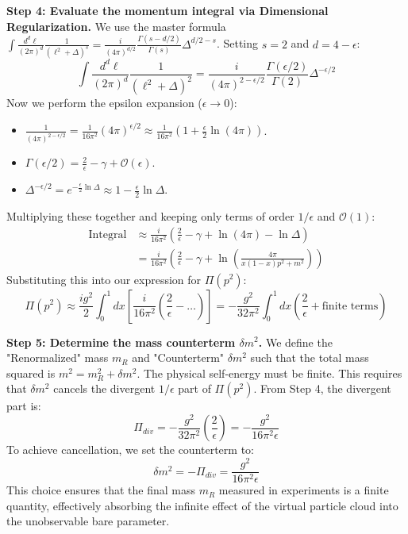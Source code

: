 \begin{solution}
\textbf{Step 4: Evaluate the momentum integral via Dimensional Regularization.}
We use the master formula $\int \frac{d^d \ell}{(2\pi)^d} \frac{1}{(\ell^2 + \Delta)^s} = \frac{i}{(4\pi)^{d/2}} \frac{\Gamma(s-d/2)}{\Gamma(s)} \Delta^{d/2-s}$.
Setting $s=2$ and $d=4-\epsilon$:
\begin{equation*}
    \int \frac{d^d \ell}{(2\pi)^d} \frac{1}{(\ell^2 + \Delta)^2} = \frac{i}{(4\pi)^{2-\epsilon/2}} \frac{\Gamma(\epsilon/2)}{\Gamma(2)} \Delta^{-\epsilon/2}
\end{equation*}
Now we perform the epsilon expansion ($\epsilon \to 0$):
\begin{itemize}
    \item $\frac{1}{(4\pi)^{2-\epsilon/2}} = \frac{1}{16\pi^2} (4\pi)^{\epsilon/2} \approx \frac{1}{16\pi^2} (1 + \frac{\epsilon}{2} \ln(4\pi))$.
    \item $\Gamma(\epsilon/2) = \frac{2}{\epsilon} - \gamma + \mathcal{O}(\epsilon)$.
    \item $\Delta^{-\epsilon/2} = e^{-\frac{\epsilon}{2}\ln\Delta} \approx 1 - \frac{\epsilon}{2}\ln\Delta$.
\end{itemize}
Multiplying these together and keeping only terms of order $1/\epsilon$ and $\mathcal{O}(1)$:
\begin{align*}
    \text{Integral} &\approx \frac{i}{16\pi^2} \left( \frac{2}{\epsilon} - \gamma + \ln(4\pi) - \ln\Delta \right) \\
    &= \frac{i}{16\pi^2} \left( \frac{2}{\epsilon} - \gamma + \ln \left( \frac{4\pi}{x(1-x)p^2 + m^2} \right) \right)
\end{align*}
Substituting this into our expression for $\Pi(p^2)$:
\begin{equation*}
    \Pi(p^2) \approx \frac{i g^2}{2} \int_0^1 dx \left[ \frac{i}{16\pi^2} \left( \frac{2}{\epsilon} - \dots \right) \right] = -\frac{g^2}{32\pi^2} \int_0^1 dx \left( \frac{2}{\epsilon} + \text{finite terms} \right)
\end{equation*}

\textbf{Step 5: Determine the mass counterterm $\delta m^2$.}
We define the "Renormalized" mass $m_R$ and "Counterterm" $\delta m^2$ such that the total mass squared is $m^2 = m_R^2 + \delta m^2$.
The physical self-energy must be finite. This requires that $\delta m^2$ cancels the divergent $1/\epsilon$ part of $\Pi(p^2)$.
From Step 4, the divergent part is:
\begin{equation*}
    \Pi_{div} = -\frac{g^2}{32\pi^2} \left( \frac{2}{\epsilon} \right) = -\frac{g^2}{16\pi^2 \epsilon}
\end{equation*}
To achieve cancellation, we set the counterterm to:
\begin{equation*}
    \delta m^2 = - \Pi_{div} = \frac{g^2}{16\pi^2 \epsilon}
\end{equation*}
This choice ensures that the final mass $m_R$ measured in experiments is a finite quantity, effectively absorbing the infinite effect of the virtual particle cloud into the unobservable bare parameter.
\end{solution}
